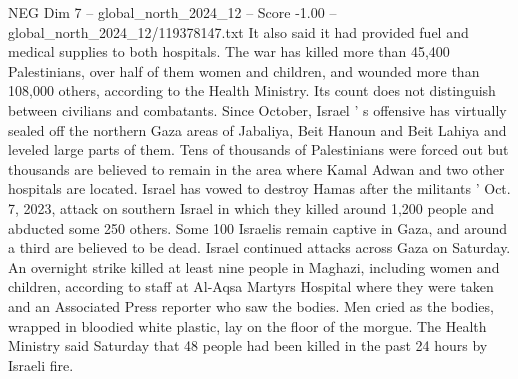 \begin{textsample}{NEG Dim 7 – global\_north\_2024\_12 – Score -1.00 – global\_north\_2024\_12/119378147.txt}
It also said it had provided fuel and medical supplies to both hospitals.
The war has killed more than 45,400 Palestinians, over half of them women and children, and wounded more than 108,000 others, according to the Health Ministry.
Its count does not distinguish between civilians and combatants.
Since October, Israel ' s offensive has virtually sealed off the northern Gaza areas of Jabaliya, Beit Hanoun and Beit Lahiya and leveled large parts of them.
Tens of thousands of Palestinians were forced out but thousands are believed to remain in the area where Kamal Adwan and two other hospitals are located.
Israel has vowed to destroy Hamas after the militants ' Oct. 7, 2023, attack on southern Israel in which they killed around 1,200 people and abducted some 250 others.
Some 100 Israelis remain captive in Gaza, and around a third are believed to be dead.
Israel continued attacks across Gaza on Saturday.
An overnight strike killed at least nine people in Maghazi, including women and children, according to staff at Al-Aqsa Martyrs Hospital where they were taken and an Associated Press reporter who saw the bodies.
Men cried as the bodies, wrapped in bloodied white plastic, lay on the floor of the morgue.
The Health Ministry said Saturday that 48 people had been killed in the past 24 hours by Israeli fire.

\end{textsample}
